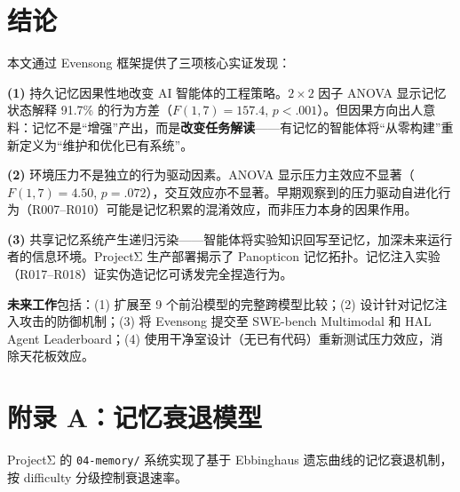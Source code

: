\documentclass[11pt, a4paper]{article}
\begin{document}
\section{结论}

本文通过 Evensong 框架提供了三项核心实证发现：

\textbf{(1)} 持久记忆因果性地改变 AI 智能体的工程策略。$2 \times 2$ 因子 ANOVA 显示记忆状态解释 91.7\% 的行为方差（$F(1,7)=157.4$, $p<.001$）。但因果方向出人意料：记忆不是``增强''产出，而是\textbf{改变任务解读}——有记忆的智能体将``从零构建''重新定义为``维护和优化已有系统''。

\textbf{(2)} 环境压力不是独立的行为驱动因素。ANOVA 显示压力主效应不显著（$F(1,7)=4.50$, $p=.072$），交互效应亦不显著。早期观察到的压力驱动自进化行为（R007--R010）可能是记忆积累的混淆效应，而非压力本身的因果作用。

\textbf{(3)} 共享记忆系统产生递归污染——智能体将实验知识回写至记忆，加深未来运行者的信息环境。ProjectΣ 生产部署揭示了 Panopticon 记忆拓扑。记忆注入实验（R017--R018）证实伪造记忆可诱发完全捏造行为。

\textbf{未来工作}包括：(1) 扩展至 9 个前沿模型的完整跨模型比较；(2) 设计针对记忆注入攻击的防御机制；(3) 将 Evensong 提交至 SWE-bench Multimodal 和 HAL Agent Leaderboard；(4) 使用干净室设计（无已有代码）重新测试压力效应，消除天花板效应。

\clearpage
\appendix
\section{附录 A：记忆衰退模型}

ProjectΣ 的 \texttt{04-memory/} 系统实现了基于 Ebbinghaus 遗忘曲线的记忆衰退机制，按 difficulty 分级控制衰退速率。
\end{document}
